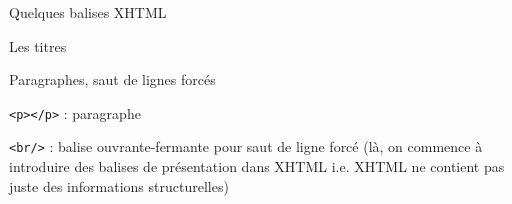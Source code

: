 \begin{frame}{Quelques balises XHTML}

Les titres

\bigskip




\framebreak

Paragraphes, saut de lignes forc\'es

\bigskip




\verb?<p></p>? : paragraphe

\verb?<br/>? : balise ouvrante-fermante pour saut de ligne forc\'e (là, on commence à introduire des balises de pr\'esentation dans XHTML i.e. XHTML ne contient pas juste des informations structurelles)


\framebreak


\end{frame}
